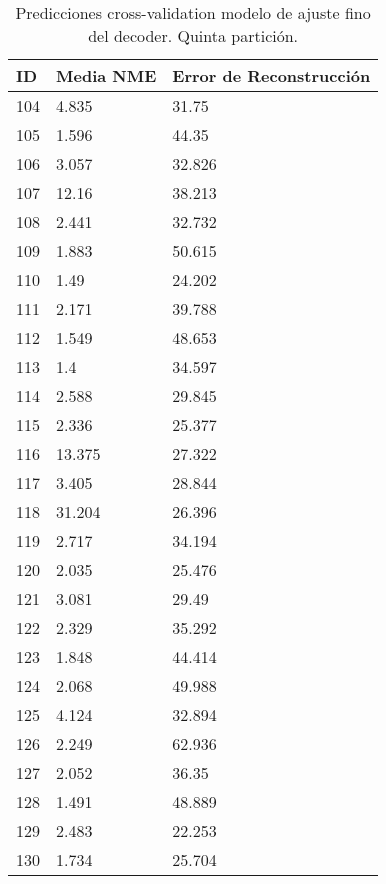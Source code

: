\begin{table}[!ht]
    \centering
    \caption{Predicciones cross-validation modelo de ajuste fino del  decoder. Quinta partición.}
    \begin{tabular}{|l|l|l|}
    \hline
    \cellcolor{gray!25}\textbf{ID} & \cellcolor{gray!25}\textbf{Media NME} & \cellcolor{gray!25}\textbf{Error de Reconstrucción} \\ \hline
        104 & 4.835 & 31.75 \\ \hline
        105 & 1.596 & 44.35 \\ \hline
        106 & 3.057 & 32.826 \\ \hline
        107 & 12.16 & 38.213 \\ \hline
        108 & 2.441 & 32.732 \\ \hline
        109 & 1.883 & 50.615 \\ \hline
        110 & 1.49 & 24.202 \\ \hline
        111 & 2.171 & 39.788 \\ \hline
        112 & 1.549 & 48.653 \\ \hline
        113 & 1.4 & 34.597 \\ \hline
        114 & 2.588 & 29.845 \\ \hline
        115 & 2.336 & 25.377 \\ \hline
        116 & 13.375 & 27.322 \\ \hline
        117 & 3.405 & 28.844 \\ \hline
        118 & 31.204 & 26.396 \\ \hline
        119 & 2.717 & 34.194 \\ \hline
        120 & 2.035 & 25.476 \\ \hline
        121 & 3.081 & 29.49 \\ \hline
        122 & 2.329 & 35.292 \\ \hline
        123 & 1.848 & 44.414 \\ \hline
        124 & 2.068 & 49.988 \\ \hline
        125 & 4.124 & 32.894 \\ \hline
        126 & 2.249 & 62.936 \\ \hline
        127 & 2.052 & 36.35 \\ \hline
        128 & 1.491 & 48.889 \\ \hline
        129 & 2.483 & 22.253 \\ \hline
        130 & 1.734 & 25.704 \\ \hline
    \end{tabular}
\end{table}

\endinput

